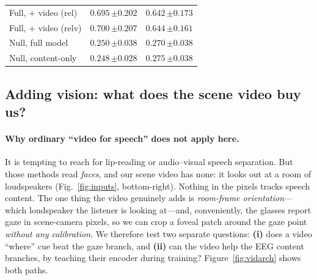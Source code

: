 \documentclass[10pt,twocolumn]{article}
\newcommand{\fusedFovRel}{0.695}\newcommand{\fusedFovRelS}{0.202}
\newcommand{\fusedFovRelv}{0.700}\newcommand{\fusedFovRelvS}{0.207}
\newcommand{\nullFused}{0.250}\newcommand{\nullFusedS}{0.038}
\newcommand{\nullCfused}{0.248}\newcommand{\nullCfusedS}{0.028}
\newcommand{\losoFusedVid}{0.642}\newcommand{\losoFusedVidS}{0.173}
\newcommand{\losoFusedRelv}{0.644}\newcommand{\losoFusedRelvS}{0.161}   %
\newcommand{\nullLosoFused}{0.270}\newcommand{\nullLosoFusedS}{0.038}
\newcommand{\losoNullCfused}{0.275}\newcommand{\losoNullCfusedS}{0.038}
\newcommand{\acc}[2]{$#1$\,{\footnotesize$\pm#2$}}   %
\begin{document}
\begin{table}[H]
\begin{tabular}{@{}l r r@{}}
\quad Full, $+$ video \footnotesize(rel)         & \acc{\fusedFovRel}{\fusedFovRelS} & \acc{\losoFusedVid}{\losoFusedVidS} \\
\quad Full, $+$ video \footnotesize(relv)        & \textbf{\acc{\fusedFovRelv}{\fusedFovRelvS}} & \textbf{\acc{\losoFusedRelv}{\losoFusedRelvS}} \\
\midrule
Null, full model        & \acc{\nullFused}{\nullFusedS}   & \acc{\nullLosoFused}{\nullLosoFusedS} \\
Null, content-only      & \acc{\nullCfused}{\nullCfusedS} & \acc{\losoNullCfused}{\losoNullCfusedS} \\
\bottomrule
\end{tabular}
\end{table}

\subsection{Adding vision: what does the scene video buy us?}
\label{sec:asd-video}

\paragraph{Why ordinary ``video for speech'' does not apply here.}
It is tempting to reach for lip-reading or audio--visual speech separation. But
those methods read \emph{faces}, and our scene video has none: it looks out at a
room of loudspeakers (Fig.~\ref{fig:inputs}, bottom-right). Nothing in the pixels
tracks speech content. The one thing the video genuinely adds is \emph{room-frame
orientation}---which loudspeaker the listener is looking at---and, conveniently,
the glasses report gaze in scene-camera pixels, so we can crop a foveal patch
around the gaze point \emph{without any calibration}. We therefore test two
separate questions: \textbf{(i)} does a video ``where'' cue beat the gaze branch,
and \textbf{(ii)} can the video help the EEG content branches, by teaching their
encoder during training? Figure~\ref{fig:vidarch} shows both paths.
\end{document}
